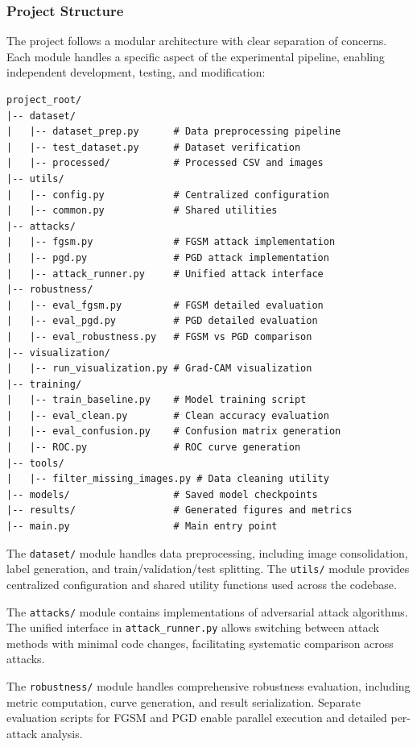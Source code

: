 \documentclass[12pt,a4paper]{article}
\begin{document}
\subsubsection{Project Structure}

The project follows a modular architecture with clear separation of concerns. Each module handles a specific aspect of the experimental pipeline, enabling independent development, testing, and modification:

\begin{lstlisting}[caption={Project Directory Structure}]
project_root/
|-- dataset/
|   |-- dataset_prep.py      # Data preprocessing pipeline
|   |-- test_dataset.py      # Dataset verification
|   |-- processed/           # Processed CSV and images
|-- utils/
|   |-- config.py            # Centralized configuration
|   |-- common.py            # Shared utilities
|-- attacks/
|   |-- fgsm.py              # FGSM attack implementation
|   |-- pgd.py               # PGD attack implementation
|   |-- attack_runner.py     # Unified attack interface
|-- robustness/
|   |-- eval_fgsm.py         # FGSM detailed evaluation
|   |-- eval_pgd.py          # PGD detailed evaluation
|   |-- eval_robustness.py   # FGSM vs PGD comparison
|-- visualization/
|   |-- run_visualization.py # Grad-CAM visualization
|-- training/
|   |-- train_baseline.py    # Model training script
|   |-- eval_clean.py        # Clean accuracy evaluation
|   |-- eval_confusion.py    # Confusion matrix generation
|   |-- ROC.py               # ROC curve generation
|-- tools/
|   |-- filter_missing_images.py # Data cleaning utility
|-- models/                  # Saved model checkpoints
|-- results/                 # Generated figures and metrics
|-- main.py                  # Main entry point
\end{lstlisting}

The \texttt{dataset/} module handles data preprocessing, including image consolidation, label generation, and train/validation/test splitting. The \texttt{utils/} module provides centralized configuration and shared utility functions used across the codebase.

The \texttt{attacks/} module contains implementations of adversarial attack algorithms. The unified interface in \texttt{attack\_runner.py} allows switching between attack methods with minimal code changes, facilitating systematic comparison across attacks.

The \texttt{robustness/} module handles comprehensive robustness evaluation, including metric computation, curve generation, and result serialization. Separate evaluation scripts for FGSM and PGD enable parallel execution and detailed per-attack analysis.
\end{document}

